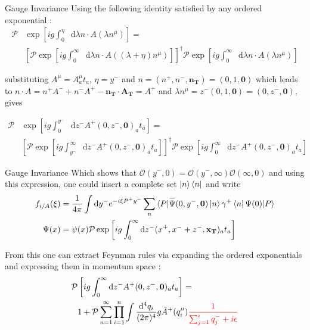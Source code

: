 \documentclass[aspectratio=169,xcolor=dvipsnames]{beamer}
\newcommand{\overbar}[1]{
	\mkern 1.5mu \overline{\mkern-1.5mu\raisebox{0pt}[\dimexpr\height+0.5mm\relax]{$#1$}\mkern-1.5mu}\mkern 1.5mu
}
\newcommand*\dif{\mathop{}\!\mathrm{d}}
\begin{document}
\begin{frame}{Gauge Invariance}
	Using the following identity satisfied by any ordered exponential :
	\begin{align*}
	\mathcal{P} &\exp \left[ ig \int_{0}^{\eta} \dif \lambda n\cdot A(\lambda n^\mu) \right] = \\
	&\left[\mathcal{P} \exp\left[ ig \int_{0}^{\infty} \dif \lambda n\cdot A((\lambda+\eta) n^\mu) \right] \right]^\dagger \mathcal{P} \exp \left[ ig \int_{0}^{\infty} \dif \lambda n\cdot A(\lambda n^\mu) \right]
	\end{align*}\vskip0.1in
	
	substituting $A^\mu = A^\mu_a t_a$, $\eta = y^-$ and $n = (n^+,n^-,\mathbf{n_T})=(0,1,\mathbf{0})$  which leads to $n \cdot A = n^+A^- + n^- A^+ - \mathbf{n_T}\cdot \mathbf{A_T} =A^+$ and $\lambda n^\mu = z^-(0,1,\mathbf{0})=(0,z^-,\mathbf{0})$, gives
	
	\begin{align*}
	\mathcal{P} &\exp \left[ ig \int_{0}^{y^-} \dif z^-  A^+(0,z^-,\mathbf{0})_a t_a \right] = \\
	&\left[\mathcal{P} \exp\left[ ig \int_{y^-}^{\infty} \dif z^-  A^+(0,z^-,\mathbf{0})_a t_a \right] \right]^\dagger \mathcal{P} \exp \left[ ig \int_{0}^{\infty} \dif z^-  A^+(0,z^-,\mathbf{0})_a t_a \right]
	\end{align*}
\end{frame}

\begin{frame}{Gauge Invariance}
	Which shows that $\mathcal{O}(y^-,0)=\mathcal{O}(y^-,\infty)\mathcal{O}(\infty,0)$ and using this expression, one could insert a complete set $\ket{n}\bra{n}$ and write 
	\begin{align*}
		f_{i/A}(\xi) &= \frac{1}{4\pi} \int \dif y^- e^{-i\xi P^+ y^-}\sum_n \braket{P|  \overbar{\Psi}(0,y^-,\mathbf{0})\ket{n}\gamma^+\bra{n}\Psi(0) |P} \\
		\Psi(x) &= \psi(x) \mathcal{P} \exp \left[ ig \int_{0}^{\infty} \dif z^- (x^+,x^-+z^-,\mathbf{x_T})_a t_a \right]
	\end{align*}
	
	From this one can extract Feynman rules via expanding the ordered exponentials and expressing them in momentum space : 
	\begin{align*}
		\mathcal{P} &\left[ ig \int_{0}^{\infty} \dif z^- A^+(0,z^-,\mathbf{0})_a t_a  \right] = \\
		&1+ \mathcal{P} \sum_{n=1}^{\infty}\prod_{i=1}^{n} \int \frac{\dif^4 q_i}{(2\pi)^4} g \tilde{A}^+(q_i^\mu)\begingroup \color{red}\frac{1}{\sum^{i}_{j=1} q_j^- +i\epsilon}\endgroup
	\end{align*}
	
\end{frame}
\end{document}
